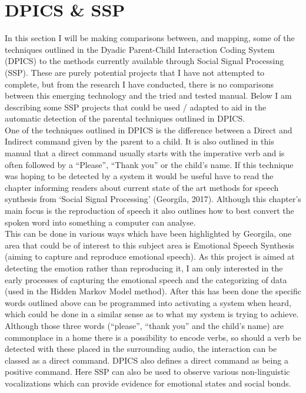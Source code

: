 \documentclass[a4paper,11pt]{report}
\begin{document}
\chapter{DPICS \& SSP}
In this section I will be making comparisons between, and mapping, some of the techniques outlined in the Dyadic Parent-Child Interaction Coding System (DPICS) to the methods currently available through Social Signal Processing (SSP). These are purely potential projects that I have not attempted to complete, but from the research I have conducted, there is no comparisons between this emerging technology and the tried and tested manual. Below I am describing some SSP projects that could be used / adapted to aid in the automatic detection of the parental techniques outlined in DPICS.\\

One of the techniques outlined in DPICS is the difference between a Direct and Indirect command given by the parent to a child. It is also outlined in this manual that a direct command usually starts with the imperative verb and is often followed by a “Please”, “Thank you” or the child’s name. If this technique was hoping to be detected by a system it would be useful have to read the chapter informing readers about current state of the art methods for speech synthesis from ‘Social Signal Processing’ (Georgila, 2017). Although this chapter’s main focus is the reproduction of speech it also outlines how to best convert the spoken word into something a computer can analyse. \\

This can be done in various ways which have been highlighted by Georgila, one area that could be of interest to this subject area is Emotional Speech Synthesis (aiming to capture and reproduce emotional speech). As this project is aimed at detecting the emotion rather than reproducing it, I am only interested in the early processes of capturing the emotional speech and the categorizing of data (used in the Hidden Markov Model method). After this has been done the specific words outlined above can be programmed into activating a system when heard, which could be done in a similar sense as to what my system is trying to achieve. Although those three words (“please”, “thank you” and the child’s name) are commonplace in a home there is a possibility to encode verbs, so should a verb be detected with these placed in the surrounding audio, the interaction can be classed as a direct command. DPICS also defines a direct command as being a positive command. Here SSP can also be used to observe various non-linguistic vocalizations which can provide evidence for emotional states and social bonds.\\
\end{document}
